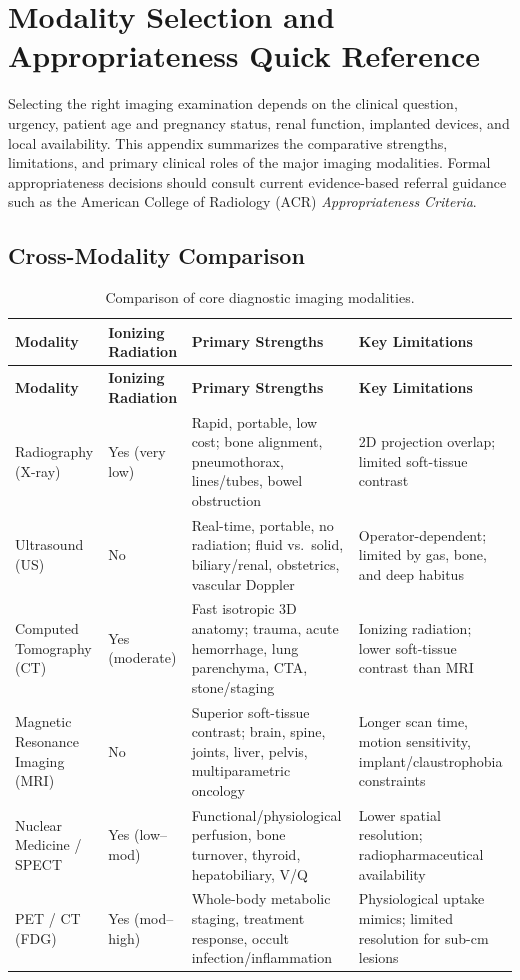 \chapter{Modality Selection and Appropriateness Quick Reference}
\label{app:modality_selection}

Selecting the right imaging examination depends on the clinical question, urgency, patient age and pregnancy status, renal function, implanted devices, and local availability. This appendix summarizes the comparative strengths, limitations, and primary clinical roles of the major imaging modalities. Formal appropriateness decisions should consult current evidence-based referral guidance such as the American College of Radiology (ACR) \textit{Appropriateness Criteria}.

\section{Cross-Modality Comparison}

\begin{longtable}{@{}p{}p{}p{}p{}@{}}
\caption{Comparison of core diagnostic imaging modalities.}
\label{tab:app_modality_comparison} \\
\toprule
\textbf{Modality} & \textbf{Ionizing Radiation} & \textbf{Primary Strengths} & \textbf{Key Limitations} \\
\midrule
\endfirsthead
\toprule
\textbf{Modality} & \textbf{Ionizing Radiation} & \textbf{Primary Strengths} & \textbf{Key Limitations} \\
\midrule
\endhead
Radiography (X-ray) & Yes (very low) & Rapid, portable, low cost; bone alignment, pneumothorax, lines/tubes, bowel obstruction & 2D projection overlap; limited soft-tissue contrast \\
Ultrasound (US) & No & Real-time, portable, no radiation; fluid vs.\ solid, biliary/renal, obstetrics, vascular Doppler & Operator-dependent; limited by gas, bone, and deep habitus \\
Computed Tomography (CT) & Yes (moderate) & Fast isotropic 3D anatomy; trauma, acute hemorrhage, lung parenchyma, CTA, stone/staging & Ionizing radiation; lower soft-tissue contrast than MRI \\
Magnetic Resonance Imaging (MRI) & No & Superior soft-tissue contrast; brain, spine, joints, liver, pelvis, multiparametric oncology & Longer scan time, motion sensitivity, implant/claustrophobia constraints \\
Nuclear Medicine / SPECT & Yes (low--mod) & Functional/physiological perfusion, bone turnover, thyroid, hepatobiliary, V/Q & Lower spatial resolution; radiopharmaceutical availability \\
PET / CT (FDG) & Yes (mod--high) & Whole-body metabolic staging, treatment response, occult infection/inflammation & Physiological uptake mimics; limited resolution for sub-cm lesions \\
\bottomrule
\end{longtable}

